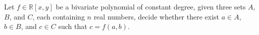 \begin{problem}[name=explicit 3POL,restate=ProblemPOLExplicit]%
\label{problem:3pol:explicit}
Let $f \in \mathbb{R}[x,y]$ be a bivariate polynomial of constant degree,
given three sets $A$, $B$, and $C$, each containing $n$ real numbers, decide
whether there exist $a \in A$, $b \in B$, and $c \in C$ such that $c=f(a,b)$.
\end{problem}
